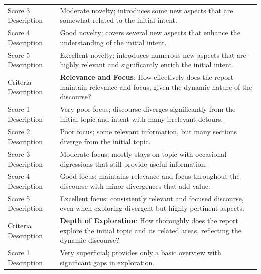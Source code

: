\documentclass[11pt]{article}
\begin{document}
\begin{table}
{\begin{tabular}{ll}
Score 3 Description  & Moderate novelty; introduces some new aspects that are somewhat related to the initial intent.                                                                                  \\
Score 4 Description  & Good novelty; covers several new aspects that enhance the understanding of the initial intent.                                                                                                                      \\
Score 5 Description  & Excellent novelty; introduces numerous new aspects that are highly relevant and significantly enrich the initial intent.                                                                             \\ 
\midrule
Criteria Description & \textbf{Relevance and Focus}: How effectively does the report maintain relevance and focus, given the dynamic nature of the discourse?                                                                  \\
Score 1 Description  & Very poor focus; discourse diverges significantly from the initial topic and intent with many irrelevant detours.                                                                                                \\
Score 2 Description  & Poor focus; some relevant information, but many sections diverge from the initial topic.                                                                     \\
Score 3 Description  & Moderate focus; mostly stays on topic with occasional digressions that still provide useful information.                                                                                                                                    \\
Score 4 Description  & Good focus; maintains relevance and focus throughout the discourse with minor divergences that add value.                                                                 \\
Score 5 Description  & Excellent focus; consistently relevant and focused discourse, even when exploring divergent but highly pertinent aspects.  \\ 
\midrule
Criteria Description & \textbf{Depth of Exploration}: How thoroughly does the report explore the initial topic and its related areas, reflecting the dynamic discourse?                                                                     \\
Score 1 Description  & Very superficial; provides only a basic overview with significant gaps in exploration.                                                                    \\

\end{tabular}}
\end{table}
\end{document}
